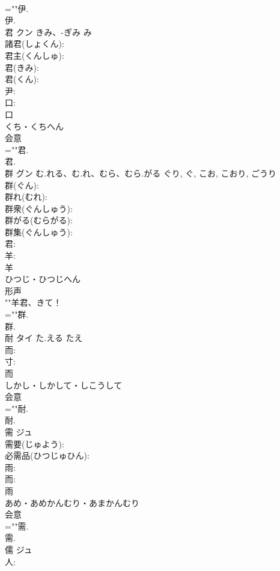 \documentclass[8pt]{extreport}
\begin{document}
\begin{CJK}{UTF8}{min}
\\	=""伊.
\\	伊.
\\	君	クン	きみ、-ぎみ	み	
\\	諸君(しょくん): 
\\	君主(くんしゅ): 
\\	君(きみ): 
\\	君(くん): 
\\	尹: 
\\	口: 
\\	口	
\\	くち・くちへん	
\\	会意 
\\	=""君.
\\	君.
\\	群	グン	む.れる、む.れ、むら、むら.がる	ぐり, ぐ, こお, こおり, ごうり	
\\	群(ぐん): 
\\	群れ(むれ): 
\\	群衆(ぐんしゅう): 
\\	群がる(むらがる): 
\\	群集(ぐんしゅう): 
\\	君: 
\\	羊: 
\\	羊	
\\	ひつじ・ひつじへん	
\\	形声 
\\	""羊君、きて！
\\	=""群.
\\	群.
\\	耐	タイ	た.える	たえ	
\\	而: 
\\	寸: 
\\	而	
\\	しかし・しかして・しこうして	
\\	会意 
\\	=""耐.
\\	耐.
\\	需	ジュ			
\\	需要(じゅよう): 
\\	必需品(ひつじゅひん): 
\\	雨: 
\\	而: 
\\	雨	
\\	あめ・あめかんむり・あまかんむり	
\\	会意 
\\	=""需.
\\	需.
\\	儒	ジュ			
\\	人: 

\end{CJK}
\end{document}
